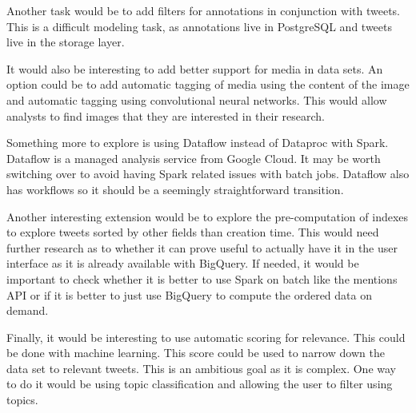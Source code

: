 Another task would be to add filters for annotations in conjunction with tweets. This is a difficult modeling task, as annotations live in PostgreSQL and tweets live in the storage layer. 

It would also be interesting to add better support for media in data sets. An option could be to add automatic tagging of media using the content of the image and automatic tagging using convolutional neural networks. This would allow analysts to find images that they are interested in their research. 

Something more to explore is using Dataflow instead of Dataproc with Spark. Dataflow is a managed analysis service from Google Cloud. It may be worth switching over to avoid having Spark related issues with batch jobs. Dataflow also has workflows so it should be a seemingly straightforward transition. 

Another interesting extension would be to explore the pre-computation of indexes to explore tweets sorted by other fields than creation time. This would need further research as to whether it can prove useful to actually have it in the user interface as it is already available with BigQuery. If needed, it would be important to check whether it is better to use Spark on batch like the mentions API or if it is better to just use BigQuery to compute the ordered data on demand. 

Finally, it would be interesting to use automatic scoring for relevance. This could be done with machine learning. This score could be used to narrow down the data set to relevant tweets. This is an ambitious goal as it is complex. One way to do it would be using topic classification and allowing the user to filter using topics. 


